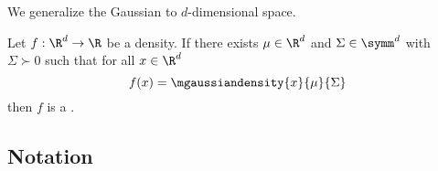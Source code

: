 

We generalize the Gaussian
to $d$-dimensional space.


Let $f: \R^d \to \R$ be a density.
If there exists $\mu \in \R^d$ and
$\Sigma \in \symm^d$
with $\Sigma \succ 0$ such that for all $x \in \R^d$
\[
  f(x) = \mgaussiandensity{x}{\mu}{\Sigma}
\]
then $f$ is a .

\subsection{Notation}
